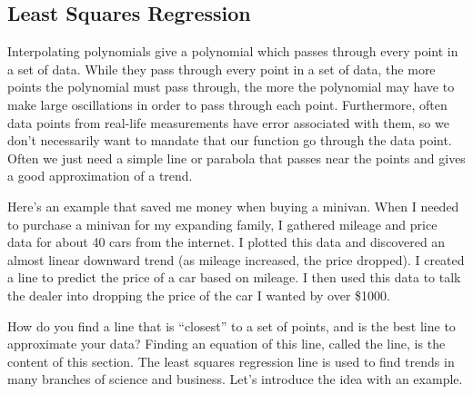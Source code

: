 \subsection{Least Squares Regression}
Interpolating polynomials give a polynomial which passes through every point in a set of data. 
While they pass through every point in a set of data, the more points the polynomial must pass through, the more the polynomial may have to make large oscillations in order to pass through each point.  Furthermore, often data points from real-life measurements have error associated with them, so we don't necessarily want to mandate that our function go through the data point.
Often we just need a simple line or parabola that passes near the points and gives a good approximation of a trend. 

Here's an example that saved me money when buying a minivan. 
When I needed to purchase a minivan for my expanding family, I gathered mileage and price data for about 40 cars from the internet. 
I plotted this data and discovered an almost linear downward trend (as mileage increased, the price dropped).  
I created a line to predict the price of a car based on mileage.  
I then used this data to talk the dealer into dropping the price of the car I wanted by over \$1000. 

How do you find a line that is ``closest'' to a set of points, and is the best line to approximate your data?  Finding an equation of this line, called the  line, is the content of this section.  The least squares regression line is used to find trends in many branches of science and business.   Let's introduce the idea with an example. 

